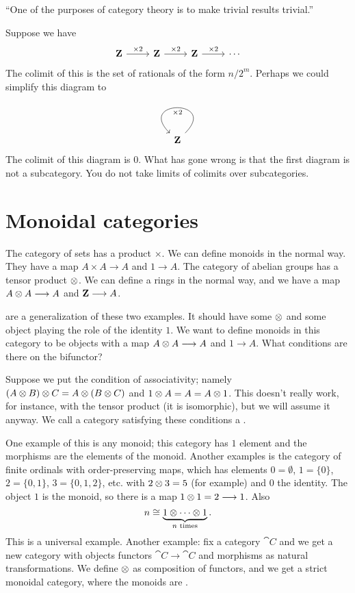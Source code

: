 \documentclass[11pt, twoside]{article}
\begin{document}
``One of the purposes of category theory is to make trivial results trivial.''

Suppose we have
$$
\begin{tikzcd}
\Z \arrow[r, "\times 2"] & \Z\arrow[r, "\times 2"]& \Z\arrow[r, "\times 2"] & \cdots
\end{tikzcd}
$$
The colimit of this is the set of rationals of the form $n/2^m$. Perhaps we could simplify this diagram to 
$$
\begin{tikzcd}
\Z \arrow[loop, "\times 2"] 
\end{tikzcd}
$$
The colimit of this diagram is $0$. What has gone wrong is that the first diagram is not a subcategory. You do not take limits of colimits over subcategories. 

\section{Monoidal categories}
The category of sets has a product $\times$. We can define monoids in the normal way. They have a map $A\times A \longrightarrow A$ and $1\longrightarrow A$. The category of abelian groups has a tensor product $\otimes$. We can define a rings in the normal way, and we have a map $A\otimes A \longrightarrow A$ and $\mathbf{Z} \longrightarrow A$. 

\href{https://en.wikipedia.org/wiki/Monoidal_category}{} are a generalization of these two examples. It should have some \href{https://en.wikipedia.org/wiki/Functor#Bifunctors_and_multifunctors}{} $\otimes$ and some object playing the role of the identity $1$. We want to define monoids in this category to be objects with a map $A\otimes A\longrightarrow A$ and $1\longrightarrow A$. What conditions are there on the bifunctor?

Suppose we put the condition of associativity; namely $(A\otimes B)\otimes C = A \otimes (B\otimes C)$ and $1\otimes A = A = A\otimes 1$. This doesn't really work, for instance, with the tensor product (it is isomorphic), but we will assume it anyway. We call a category satisfying these conditions a \href{https://en.wikipedia.org/wiki/Monoidal_category}{}.

One example of this is any monoid; this category has $1$ element and the morphisms are the elements of the monoid. Another examples is the category of finite ordinals with order-preserving maps, which has elements $0=\emptyset$, $1 = \{0\}$, $2 = \{0,1\}$, $3 = \{0,1,2\}$, etc. with $2\otimes 3 = 5$ (for example) and $0$ the identity. The object $1$ is the monoid, so there is a map $1\otimes 1 = 2\longrightarrow 1$. Also
$$
n \cong \underbrace{1 \otimes \cdots \otimes 1 }_{n \textrm{ times}}.
$$
This is a universal example. Another example: fix a category $\cat C$ and we get a new category with objects functors $\cat C\longrightarrow\cat C$ and morphisms as natural transformations. We define $\otimes$ as composition of functors, and we get a strict monoidal category, where the monoids are \href{https://en.wikipedia.org/wiki/Monad_(category_theory)}{}.
\end{document}
